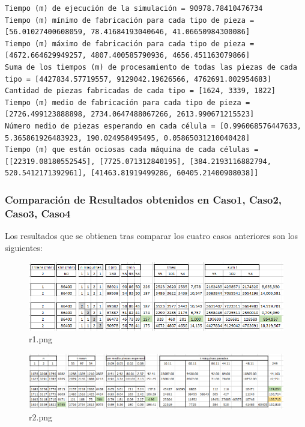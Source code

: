 \documentclass[11pt]{article}
\makeatletter
\def\maxwidth{\ifdim\Gin@nat@width>\linewidth\linewidth
    \else\Gin@nat@width\fi}
\let\Oldincludegraphics\includegraphics
\renewcommand{\includegraphics}[1]{\Oldincludegraphics[width=.8\maxwidth]{#1}}
\makeatother
\begin{document}
    \begin{Verbatim}[commandchars=\\\{\}]
Tiempo (m) de ejecución de la simulación = 90978.78410476734
Tiempo (m) mínimo de fabricación para cada tipo de pieza = [56.01027400608059, 78.41684193040646, 41.06650984300086]
Tiempo (m) máximo de fabricación para cada tipo de pieza = [4672.664629949257, 4807.400585790936, 4656.451163079866]
Suma de los tiempos (m) de procesamiento de todas las piezas de cada tipo = [4427834.57719557, 9129042.19626566, 4762691.002954683]
Cantidad de piezas fabricadas de cada tipo = [1624, 3339, 1822]
Tiempo (m) medio de fabricación para cada tipo de pieza = [2726.499123888898, 2734.0647488067266, 2613.990671215523]
Número medio de piezas esperando en cada célula = [0.996068576447633, 5.365861926483923, 190.024958495495, 0.05865031210040428]
Tiempo (m) que están ociosas cada máquina de cada células = [[22319.08180552545], [7725.071312840195], [384.2193116882794, 520.5412171392961], [41463.81919499286, 60405.21400908038]]

    \end{Verbatim}

    \subsubsection{Comparación de Resultados obtenidos en Caso1, Caso2,
Caso3,
Caso4}\label{comparaciuxf3n-de-resultados-obtenidos-en-caso1-caso2-caso3-caso4}

    Los resultados que se obtienen tras comparar los cuatro casos anteriores
son los siguientes:

    \begin{figure}
\centering
\includegraphics{./imagenes/r1.PNG}
\caption{r1.png}
\end{figure}

    \begin{figure}
\centering
\includegraphics{./imagenes/r2.PNG}
\caption{r2.png}
\end{figure}
\end{document}
